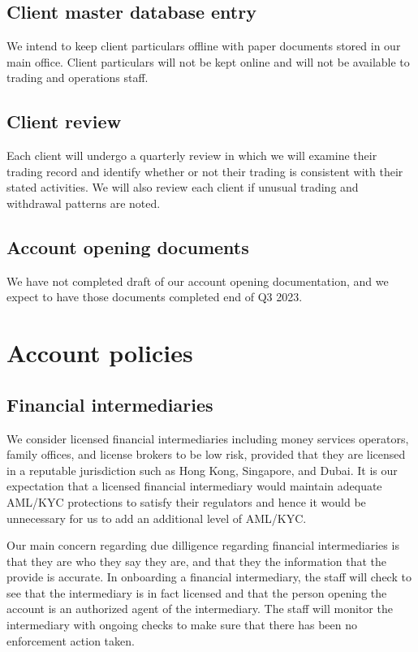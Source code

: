 \subsection{Client master database entry}
We intend to keep client particulars offline with paper documents
stored in our main office.  Client particulars will not be kept online
and will not be available to trading and operations staff.

\subsection{Client review}
Each client will undergo a quarterly review in which we will examine
their trading record and identify whether or not their trading is
consistent with their stated activities.  We will also review each
client if unusual trading and withdrawal patterns are noted.

\subsection{Account opening documents}
We have not completed draft of our account opening documentation, and
we expect to have those documents completed end of Q3 2023.

\section{Account policies}

\subsection{Financial intermediaries}
We consider licensed financial intermediaries including money services
operators, family offices, and license brokers to be low risk,
provided that they are licensed in a reputable jurisdiction such as
Hong Kong, Singapore, and Dubai.  It is our expectation that a
licensed financial intermediary would maintain adequate AML/KYC
protections to satisfy their regulators and hence it would be
unnecessary for us to add an additional level of AML/KYC.

Our main concern regarding due dilligence regarding financial
intermediaries is that they are who they say they are, and that they
the information that the provide is accurate.  In onboarding a
financial intermediary, the staff will check to see that the
intermediary is in fact licensed and that the person opening the
account is an authorized agent of the intermediary.  The staff will
monitor the intermediary with ongoing checks to make sure that there
has been no enforcement action taken.

